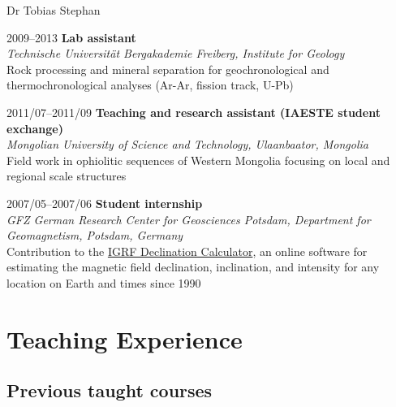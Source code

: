 \documentclass[10pt, paper=letter]{scrartcl} %
\begin{document}
\begin{cv}{\textsf{Dr Tobias Stephan}}
\begin{cvlist}{}
        \item[2009--2013] \textbf{Lab assistant}\\
        \textit{Technische Universit\"at Bergakademie Freiberg, Institute for Geology}\\ Rock processing and mineral separation for geochronological and thermochronological analyses (Ar\--Ar, fission track, U\--Pb)
        \item[2011/07--2011/09] \textbf{Teaching and research assistant (IAESTE student exchange)}\\
        \textit{Mongolian University of Science and Technology, Ulaanbaator, Mongolia}\\ Field work in ophiolitic sequences of Western Mongolia focusing on local and regional scale structures

        \item[2007/05--2007/06] \textbf{Student internship}\\
        \textit{GFZ German Research Center for Geosciences  Potsdam, Department for Geomagnetism, Potsdam, Germany}\\
        Contribution to the \href{http://isdc.gfz-potsdam.de/igrf-declination-calculator/}{IGRF Declination Calculator}, an online software for estimating the magnetic field declination, inclination, and intensity for any location on Earth and times since 1990
    \end{cvlist}

    \section{Teaching Experience}
    \subsection{Previous taught courses}


\end{cv}
\end{document}
